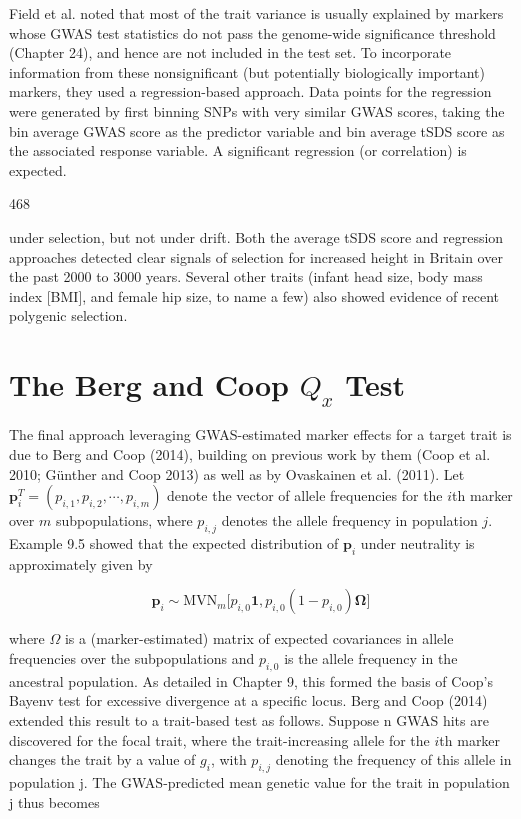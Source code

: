 \documentclass{article}
\begin{document}
Field et al. noted that most of the trait variance is usually explained by markers whose GWAS test statistics do not pass the genome-wide significance threshold (Chapter 24), and hence are not included in the test set. To incorporate information from these nonsignificant (but potentially biologically important) markers, they used a regression-based approach. Data points for the regression were generated by first binning SNPs with very similar GWAS scores, taking the bin average GWAS score as the predictor variable and bin average tSDS score as the associated response variable. A significant regression (or correlation) is expected.

468

under selection, but not under drift. Both the average tSDS score and regression approaches detected clear signals of selection for increased height in Britain over the past 2000 to 3000 years. Several other traits (infant head size, body mass index [BMI], and female hip size, to name a few) also showed evidence of recent polygenic selection.

\section{The Berg and Coop  $ Q_{x} $ Test}
The final approach leveraging GWAS-estimated marker effects for a target trait is due to Berg and Coop (2014), building on previous work by them (Coop et al. 2010; Günther and Coop 2013) as well as by Ovaskainen et al. (2011). Let  $ \mathbf{p}_i^T = (p_{i,1}, p_{i,2}, \cdots, p_{i,m}) $ denote the vector of allele frequencies for the  $ i $th marker over  $ m $ subpopulations, where  $ p_{i,j} $ denotes the allele frequency in population  $ j $. Example 9.5 showed that the expected distribution of  $ \mathbf{p}_i $ under neutrality is approximately given by

\begin{equation}
\mathbf{p}_{i}\sim\mathrm{M V N}_{m}\big[p_{i,0}\mathbf{1},p_{i,0}(1-p_{i,0})\pmb{\Omega}\big]
\tag{12.33a}
\label{eq:12_33a}
\end{equation}

where  $ \Omega $ is a (marker-estimated) matrix of expected covariances in allele frequencies over the subpopulations and  $ p_{i,0} $ is the allele frequency in the ancestral population. As detailed in Chapter 9, this formed the basis of Coop's Bayenv test for excessive divergence at a specific locus. Berg and Coop (2014) extended this result to a trait-based test as follows. Suppose n GWAS hits are discovered for the focal trait, where the trait-increasing allele for the  $ i $th marker changes the trait by a value of  $ g_i $, with  $ p_{i,j} $ denoting the frequency of this allele in population j. The GWAS-predicted mean genetic value for the trait in population j thus becomes
\end{document}
